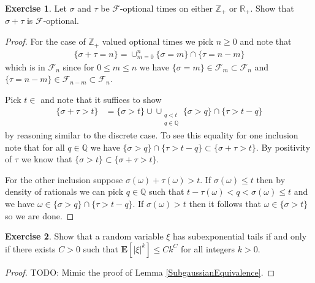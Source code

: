\documentclass{amsbook}
\theoremstyle{definition}
\newtheorem{xca}{Exercise}
\theoremstyle{remark}
\newcommand{\expectation}[1]{\textbf{E}\left[#1\right]}
\newcommand{\reals}{\mathbb{R}}
\newcommand{\rationals}{\mathbb{Q}}
\newcommand{\integers}{\mathbb{Z}}
\newcommand{\abs}[1]{\left \vert #1 \right \vert}
\begin{document}
\begin{xca}\label{SumOfOptionalTimes}Let $\sigma$ and $\tau$ be $\mathcal{F}$-optional times on
  either $\integers_+$ or $\reals_+$.
  Show that $\sigma + \tau$ is $\mathcal{F}$-optional.
\end{xca}
\begin{proof}
For the case of $\integers_+$ valued optional times we pick $n \geq 0$
and note that
\begin{align*}
\lbrace \sigma + \tau = n \rbrace = \cup_{m=0}^n \lbrace \sigma = m
\rbrace \cap \lbrace \tau = n-m \rbrace
\end{align*}
which is in $\mathcal{F}_n$ since for $0 \leq m \leq n$ we have
$\lbrace \sigma = m \rbrace \in \mathcal{F}_m \subset \mathcal{F}_n$
and $\lbrace \tau = n - m \rbrace \in \mathcal{F}_{n-m} \subset
\mathcal{F}_n$.

Pick $t \in $ and note that it suffices to show
\begin{align*}
\lbrace \sigma + \tau > t \rbrace &= \lbrace \sigma > t \rbrace \cup \cup_{\substack{q < t \\ q \in
    \rationals}} \lbrace \sigma > q \rbrace \cap \lbrace \tau > t - q \rbrace
\end{align*}
by reasoning similar to the discrete case.  To see this equality for
one inclusion note
that for all $q \in \rationals$ we have $\lbrace \sigma > q \rbrace
\cap \lbrace \tau > t - q \rbrace \subset \lbrace \sigma + \tau > t
\rbrace$.  By positivity of $\tau$ we know that $ \lbrace \sigma > t
\rbrace \subset \lbrace \sigma + \tau > t \rbrace $.

For the other inclusion suppose $\sigma(\omega) + \tau(\omega) > t$.
If $\sigma(\omega) \leq t$ then by density of rationals we can pick $q \in
\rationals$ such that $t - \tau(\omega) < q < \sigma(\omega) \leq t$ and
we have $\omega \in \lbrace \sigma > q \rbrace \cap \lbrace \tau > t -
q\rbrace$.  If $\sigma(\omega) > t$ then it follows that $\omega \in
\lbrace \sigma > t \rbrace$ so we are done.
\end{proof}

\begin{xca}Show that a random variable $\xi$ has subexponential tails
  if and only if there exists $C > 0$ such that
  $\expectation{\abs{\xi}^k} \leq C k^C$ for all integers $k > 0$.
\end{xca}
\begin{proof}
TODO: Mimic the proof of Lemma \ref{SubgaussianEquivalence}.
\end{proof}
\end{document}
